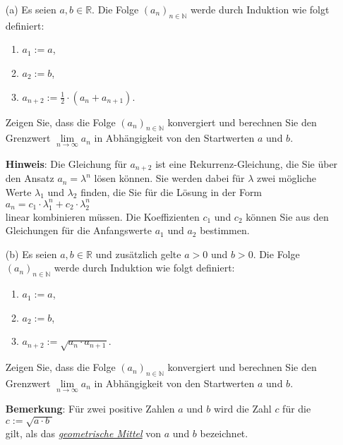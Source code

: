 \exercise
\begin{enumerate}
\item[(a)] Es seien $a,b \in \mathbb{R}$.  Die Folge $(a_n)_{n\in\mathbb{N}}$ werde durch Induktion wie folgt
           definiert:
           \begin{enumerate}
           \item $a_1 := a$,
           \item $a_2 := b$,
           \item $a_{n+2} := \frac{1}{2} \cdot (a_n + a_{n+1})$.
           \end{enumerate}
           Zeigen Sie, dass die Folge $(a_n)_{n\in\mathbb{N}}$ konvergiert und berechnen Sie den Grenzwert
           $\lim\limits_{n\rightarrow\infty} a_n$  in Abh\"angigkeit von den Startwerten $a$ und $b$.

           \noindent
           \textbf{Hinweis}: Die Gleichung f\"ur $a_{n+2}$ ist eine Rekurrenz-Gleichung, die Sie \"uber den
           Ansatz $a_n = \lambda^n$ l\"osen k\"onnen.  Sie werden dabei f\"ur $\lambda$ zwei m\"ogliche Werte
           $\lambda_1$ und $\lambda_2$ finden, die Sie f\"ur die L\"osung in der Form
           \\[0.2cm]
           \hspace*{1.3cm}
           $a_n = c_1 \cdot \lambda_1^n + c_2 \cdot \lambda_2^n$
           \\[0.2cm]
           linear kombinieren m\"ussen.  Die Koeffizienten $c_1$ und $c_2$ k\"onnen Sie aus den Gleichungen f\"ur
           die Anfangswerte $a_1$ und $a_2$ bestimmen.  
\item[(b)] Es seien $a,b \in \mathbb{R}$ und zus\"atzlich gelte $a > 0$ und $b > 0$.  
           Die Folge $(a_n)_{n\in\mathbb{N}}$ werde durch Induktion wie folgt definiert:
           \begin{enumerate}
           \item $a_1 := a$,
           \item $a_2 := b$,
           \item $a_{n+2} := \sqrt{a_n \cdot a_{n+1}}$.
           \end{enumerate}
           Zeigen Sie, dass die Folge $(a_n)_{n\in\mathbb{N}}$ konvergiert und berechnen Sie den Grenzwert
           $\lim\limits_{n\rightarrow\infty} a_n$ in  Abh\"angigkeit von den Startwerten $a$ und $b$. \eox

           \noindent
           \textbf{Bemerkung}: F\"ur zwei positive Zahlen $a$ und $b$ wird die Zahl $c$ f\"ur die 
           \\[0.2cm]
           \hspace*{1.3cm}
           $c := \sqrt{a \cdot b\;}$
           \\[0.2cm]
           gilt, als das \href{http://de.wikipedia.org/wiki/Geometrisches_Mittel}{\emph{geometrische Mittel}} 
           von $a$ und $b$ bezeichnet. 


\end{enumerate}
